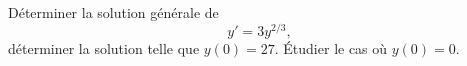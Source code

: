 

\begin{exercice}\label{exo_II-1-02}

Déterminer la solution générale de
\begin{equation}
	y'=3y^{2/3},
\end{equation}
déterminer la solution telle que $y(0)=27$. Étudier le cas où $y(0)=0$.

\end{exercice}
